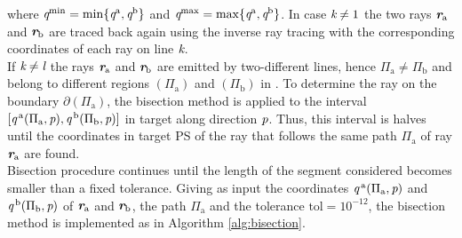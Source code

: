 where $\textit{q}^{\textrm{min}} = \min\{\textit{q}^{\textrm{a}}, \textit{q}^{\textrm{b}}\}$ and $\textit{q}^{\textrm{max}} = \max\{\textit{q}^{\textrm{a}}, \textit{q}^{\textrm{b}}\}$. In case $\textit{k}\neq1$ the two rays $\textit{\textbf{r}}_{\textrm{a}}$ and $\textit{\textbf{r}}_{\textrm{b}}$ are traced back again using the inverse ray tracing with the corresponding coordinates of each ray on line $\textit{k}$.
\\ \indent If $\textit{k}\neq \textit{l}$ the rays $\textit{\textbf{r}}_\textrm{a}$ and $\textit{\textbf{r}}_\textrm{b}$ are emitted by two-different lines, hence $\Pi_{\textrm{a}}\neq \Pi_{\textrm{b}}$ and belong to different regions $(\Pi_{\textrm{a}})$ and $(\Pi_{\textrm{b}})$ in . To determine the ray on the boundary $\partial$$(\Pi_{\textrm{a}})$, the bisection method is applied to the interval $[\textit{q}^{\,\textrm{a}}(\Pi_{\textrm{a}}, \textit{p}), \textit{q}^{\,\textrm{b}}(\Pi_{\textrm{b}}, \textit{p})]$ in target \set{}{}{} along direction $\textit{p}$. Thus, this interval is halves until the coordinates in target PS of the ray that follows the same path $\Pi_{\textrm{a}}$ of ray $\textit{\textbf{r}}_{\textrm{a}}$ are found. \\ \indent Bisection procedure continues until the length of the segment considered becomes smaller than a fixed tolerance. 
Giving as input the coordinates $\textit{q}^{\,\textrm{a}}(\Pi_{\textrm{a}}, \textit{p})$ and $\textit{q}^{\,\textrm{b}}(\Pi_{\textrm{b}}, \textit{p})$ of $\textit{\textbf{r}}_{\textrm{a}}$ and $\textit{\textbf{r}}_{\textrm{b}}$, the path $\Pi_\textrm{a}$ and the tolerance $\textrm{tol}= 10^{-12}$, the bisection method is implemented as in Algorithm \ref{alg:bisection}.
